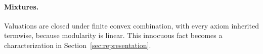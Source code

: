 \paragraph{Mixtures.}
Valuations are closed under finite convex combination, with every axiom inherited termwise,
because modularity is linear.  This innocuous fact becomes a
characterization in Section~\ref{sec:representation}.
